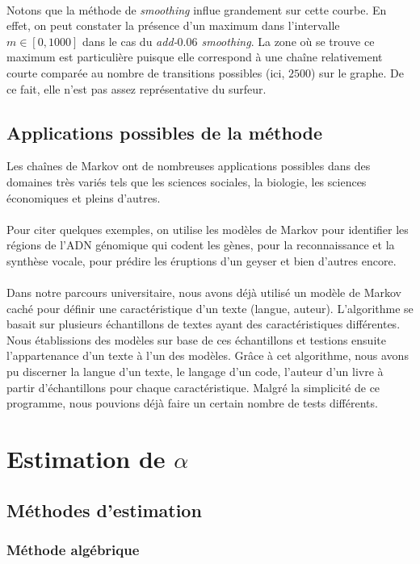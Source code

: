 \documentclass[a4paper,titlepage]{report}
\begin{document}
\paragraph{}
Notons que la méthode de \textit{smoothing} influe grandement sur cette courbe. En effet, on peut constater la présence d'un maximum dans l'intervalle $m \in [0,1000]$ dans le cas du \textit{add-$0.06$ smoothing}. La zone où se trouve ce maximum est particulière puisque elle correspond à une chaîne relativement courte comparée au nombre de transitions possibles (ici, $2500$) sur le graphe. De ce fait, elle n'est pas assez représentative du surfeur. 
\subsection{Applications possibles de la méthode}
Les chaînes de Markov ont de nombreuses applications possibles dans des domaines très variés tels que les sciences sociales, la biologie, les sciences économiques et pleins d'autres. \\ \\

Pour citer quelques exemples, on utilise les modèles de Markov pour identifier les régions de l'ADN génomique qui codent les gènes, pour la reconnaissance et la synthèse vocale, pour prédire les éruptions d'un geyser et bien d'autres encore. \\ \\

 Dans notre parcours universitaire, nous avons déjà utilisé un modèle de Markov caché pour définir une caractéristique d'un texte (langue, auteur). L'algorithme se basait sur plusieurs échantillons de textes ayant des caractéristiques différentes. Nous établissions des modèles sur base de ces échantillons et testions ensuite l'appartenance d'un texte à l'un des modèles. Grâce à cet algorithme, nous avons pu discerner la langue d'un texte, le langage d'un code, l'auteur d'un livre à partir d'échantillons pour chaque caractéristique. Malgré la simplicité de ce programme, nous pouvions déjà faire un certain nombre de tests différents. 

\section{Estimation de $\alpha$}
\subsection{Méthodes d'estimation}
\subsubsection{Méthode algébrique}
\end{document}
